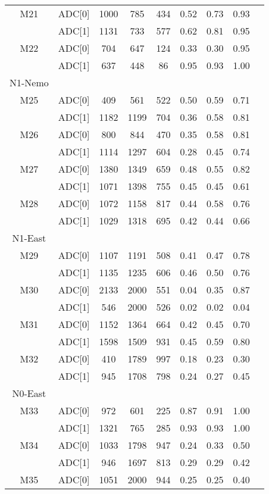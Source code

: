 \begin{longtable}{c c c c c c c c c}
  M21 & ADC[0] & 1000 & 785 & 434 & 0.52 & 0.73 & 0.93\\
      & ADC[1] & 1131 & 733 & 577 & 0.62 & 0.81 & 0.95\\
  M22 & ADC[0] & 704 & 647 & 124 & 0.33 & 0.30 & 0.95\\
      & ADC[1] & 637 & 448 & 86 & 0.95 & 0.93 & 1.00\\
  \midrule
  N1-Nemo\\
  \midrule
  M25 & ADC[0] & 409 & 561 & 522 & 0.50 & 0.59 & 0.71\\
      & ADC[1] & 1182 & 1199 & 704 & 0.36 & 0.58 & 0.81\\
  M26 & ADC[0] & 800 & 844 & 470 & 0.35 & 0.58 & 0.81\\
      & ADC[1] & 1114 & 1297 & 604 & 0.28 & 0.45 & 0.74\\
  M27 & ADC[0] & 1380 & 1349 & 659 & 0.48 & 0.55 & 0.82\\
      & ADC[1] & 1071 & 1398 & 755 & 0.45 & 0.45 & 0.61\\
  M28 & ADC[0] & 1072 & 1158 & 817 & 0.44 & 0.58 & 0.76\\
      & ADC[1] & 1029 & 1318 & 695 & 0.42 & 0.44 & 0.66\\
  \midrule
  N1-East\\
  \midrule
  M29 & ADC[0] & 1107 & 1191 & 508 & 0.41 & 0.47 & 0.78\\
      & ADC[1] & 1135 & 1235 & 606 & 0.46 & 0.50 & 0.76\\
  M30 & ADC[0] & 2133 & 2000 & 551 & 0.04 & 0.35 & 0.87\\
      & ADC[1] & 546 & 2000 & 526 & 0.02 & 0.02 & 0.04\\
  M31 & ADC[0] & 1152 & 1364 & 664 & 0.42 & 0.45 & 0.70\\
      & ADC[1] & 1598 & 1509 & 931 & 0.45 & 0.59 & 0.80\\
  M32 & ADC[0] & 410 & 1789 & 997 & 0.18 & 0.23 & 0.30\\
      & ADC[1] & 945 & 1708 & 798 & 0.24 & 0.27 & 0.45\\
  \midrule
  N0-East\\
  \midrule
  M33 & ADC[0] & 972 & 601 & 225 & 0.87 & 0.91 & 1.00\\
      & ADC[1] & 1321 & 765 & 285 & 0.93 & 0.93 & 1.00\\
  M34 & ADC[0] & 1033 & 1798 & 947 & 0.24 & 0.33 & 0.50\\
      & ADC[1] & 946 & 1697 & 813 & 0.29 & 0.29 & 0.42\\
  M35 & ADC[0] & 1051 & 2000 & 944 & 0.25 & 0.25 & 0.40\\

\end{longtable}
